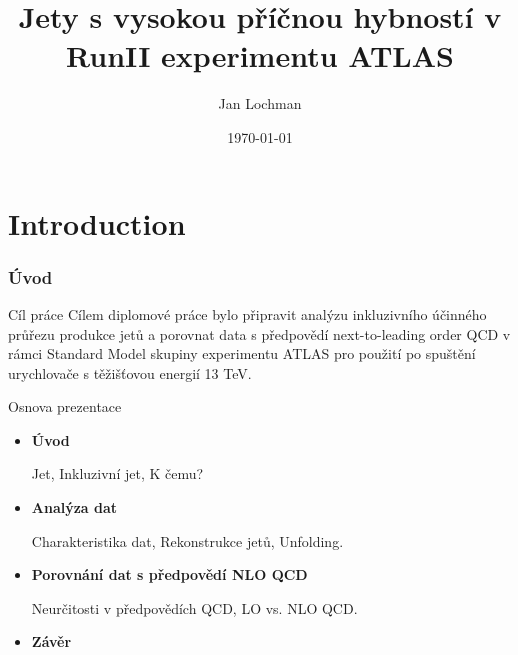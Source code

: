 \documentclass[compress]{beamer}
\title[High $\pt$ jets]{Jety s vysokou p\v{r}\'{i}\v{c}nou hybnost\'{i} v RunII
experimentu ATLAS}
\author{Jan Lochman}
\institute[FNSPE CTU] 
{
  FJFI \v{C}VUT \\
  \medskip
  \medskip
  \large
  Obhajoba diplomov\'{e} pr\'{a}ce \\ 
  \medskip
}
\date{\today}
\begin{document}

\begin{frame}
\titlepage 
\end{frame}

\section{Introduction}

\begin{frame}
\frametitle{\'{U}vod}
\begin{block}{C\'{i}l pr\'{a}ce}
  C\'{i}lem diplomov\'{e} pr\'{a}ce bylo p\v{r}ipravit anal\'{y}zu
  inkluzivn\'{i}ho
  \'{u}\v{c}inn\'{e}ho pr\r{u}\v{r}ezu
  produkce jet\r{u} a porovnat data s p\v{r}edpov\v{e}d\'{i} next-to-leading order
  QCD v r\'{a}mci
  Standard Model skupiny experimentu ATLAS pro pou\v{z}it\'{i} po
  spu\v{s}t\v{e}n\'{i} urychlova\v{c}e s
  t\v{e}\v{z}i\v{s}\v{t}ovou energi\'{i} 13 TeV.
\end{block}
\begin{block}{Osnova prezentace}
\begin{itemize}
  \item \textbf{\'{U}vod} 

    Jet, Inkluzivn\'{i} jet, K \v{c}emu?
  \item \textbf{Anal\'{y}za dat}

    Charakteristika dat, Rekonstrukce jet\r{u}, Unfolding.
  \item \textbf{Porovn\'{a}n\'{i} dat s p\v{r}edpov\v{e}d\'{i} NLO QCD}

    Neur\v{c}itosti v p\v{r}edpov\v{e}d\'{i}ch QCD, LO vs. NLO QCD.

  \item \textbf{Z\'{a}v\v{e}r}
\end{itemize}
\end{block}
\end{frame}
\end{document}
